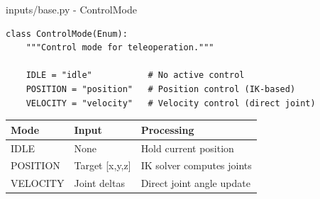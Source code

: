 \begin{frame}[fragile]{inputs/base.py - ControlMode}
\begin{lstlisting}
class ControlMode(Enum):
    """Control mode for teleoperation."""

    IDLE = "idle"           # No active control
    POSITION = "position"   # Position control (IK-based)
    VELOCITY = "velocity"   # Velocity control (direct joint)
\end{lstlisting}

\vspace{0.5cm}

\begin{table}
\centering
\begin{tabular}{lll}
\toprule
\textbf{Mode} & \textbf{Input} & \textbf{Processing} \\
\midrule
IDLE & None & Hold current position \\
POSITION & Target [x,y,z] & IK solver computes joints \\
VELOCITY & Joint deltas & Direct joint angle update \\
\bottomrule
\end{tabular}
\end{table}
\end{frame}

